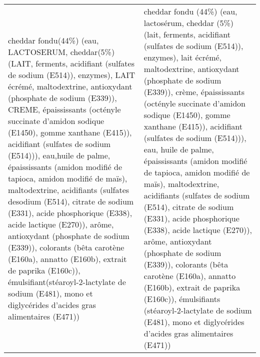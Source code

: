 \begin{tabular}{p{7cm}p{7cm}}
 cheddar fondu(44\%) (eau, LACTOSERUM, cheddar(5\%) (LAIT, ferments, acidifiant (sulfates de sodium (\newline E514)), enzymes), LAIT écrémé, maltodextrine, antioxydant (phosphate de sodium (E339)), CREME, épaississants (\newline octényle succinate d'amidon sodique (E1450), gomme xanthane (E415)), acidifiant (sulfates de sodium (E514))), eau,\newline huile de palme, épaississants (amidon modifié de tapioca, amidon modifié de maïs), maltodextrine, acidifiants (sulfates de\newline sodium (E514), citrate de sodium (E331), acide phosphorique (E338), acide lactique (E270)), arôme, antioxydant (\newline phosphate de sodium (E339)), colorants (bêta carotène (E160a), annatto (E160b), extrait de paprika (E160c)), émulsifiant\newline (stéaroyl-2-lactylate de sodium (E481), mono et diglycérides d'acides gras alimentaires (E471)) &  cheddar fondu (44\%) (eau, lactosérum, cheddar (5\%) (lait, ferments, acidifiant (sulfates de sodium (E514)), enzymes), lait écrémé, maltodextrine, antioxydant (phosphate de sodium (E339)), crème, épaississants (octényle succinate d'amidon sodique (E1450), gomme xanthane (E415)), acidifiant (sulfates de sodium (E514))), eau, huile de palme, épaississants (amidon modifié de tapioca, amidon modifié de maïs), maltodextrine, acidifiants (sulfates de sodium (E514), citrate de sodium (E331), acide phosphorique (E338), acide lactique (E270)), arôme, antioxydant (phosphate de sodium (E339)), colorants (bêta carotène (E160a), annatto (E160b), extrait de paprika (E160c)), émulsifiants (stéaroyl-2-lactylate de sodium (E481), mono et diglycérides d'acides gras alimentaires (E471)) \\

\end{tabular}
